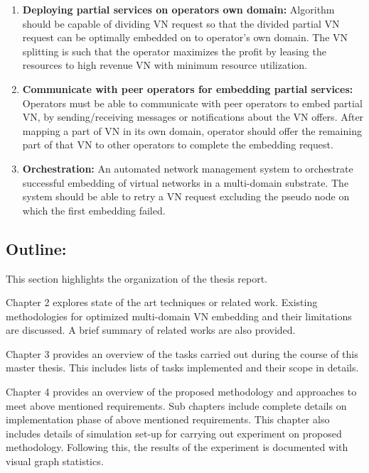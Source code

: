 \documentclass[article,dr=phil,type=msc ,colorback,accentcolor=tud4b]{tudthesis}
\begin{document}
 \begin{enumerate}					
\item \textbf{Deploying partial services on operators own domain:}
Algorithm should be capable of dividing VN request so that the divided partial VN request can be optimally embedded on to operator's own domain. The VN splitting is such that the operator maximizes the profit by leasing the resources to high revenue VN with minimum resource utilization.
\item \textbf{Communicate with peer operators for embedding partial services:}
Operators must be able to communicate with peer operators to embed partial VN, by sending/receiving messages or notifications about the VN offers. After mapping a part of VN in its own domain, operator should offer the remaining part of that VN to other operators to complete the embedding request.
\item \textbf{Orchestration:} An automated network management system to orchestrate successful embedding of virtual networks in a multi-domain substrate. The system should be able to retry a VN request excluding the pseudo node on which the first embedding failed.
\end{enumerate}	

\subsection{Outline:} 
 
This section highlights the organization of the thesis report.\newline

Chapter 2 explores state of the art techniques or related work. Existing methodologies for optimized multi-domain VN embedding and their limitations are discussed. A brief summary of related works are also provided.\newline

Chapter 3 provides an overview of the tasks carried out during the course of this master thesis. This includes lists of tasks implemented and their scope in details.\newline
 
Chapter 4 provides an overview of the proposed methodology and approaches to meet above mentioned requirements. Sub chapters include complete details on implementation phase of above mentioned requirements. This chapter also includes details of simulation set-up for carrying out experiment on proposed methodology.  Following this, the results of the experiment is documented with visual graph statistics.\newline
\end{document}
